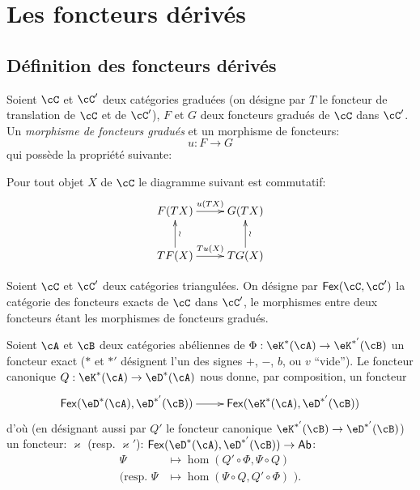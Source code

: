 \section{Les foncteurs dérivés}\label{VIII:4}










\subsection{Définition des foncteurs dérivés}\label{VIII:4-1}





\begin{definition}\label{VIII:4-1-1}
Soient $\cC$ et $\cC'$ deux catégories graduées (on désigne par $T$ le 
foncteur de translation de $\cC$ et de $\cC'$), $F$ et $G$ deux foncteurs 
gradués de $\cC$ dans $\cC'$. Un \emph{morphisme de foncteurs gradués} et 
un morphisme de foncteurs: 
\[
  u:F\to G 
\]
qui possède la propriété suivante: 

Pour tout objet $X$ de $\cC$ le diagramme suivant est commutatif: 
\[\xymatrix{
  F(T X) \ar[r]^-{u(T X)} 
    & G(T X) \\
  T F(X) \ar[r]^-{T u(X)} \ar[u]_-\wr 
    & T G(X) \ar[u]_-\wr 
}\]
\end{definition}

Soient $\cC$ et $\cC'$ deux catégories triangulées. On désigne par 
$\mathsf{Fex}(\cC,\cC')$ la catégorie des foncteurs exacts de $\cC$ dans 
$\cC'$, le morphismes entre deux foncteurs étant les morphismes de foncteurs 
gradués. 

Soient $\cA$ et $\cB$ deux catégories abéliennes de 
$\Phi:\eK^\ast(\cA)\to \eK^{\ast'}(\cB)$ un foncteur exact ($\ast$ et $\ast'$ 
désignent l'un des signes $+$, $-$, $b$, ou $v$ ``vide''). Le foncteur 
canonique $Q:\eK^\ast(\cA)\to \eD^\ast(\cA)$ nous donne, par composition, un 
foncteur 
\[\xymatrix{
  \mathsf{Fex}(\eD^\ast(\cA),\eD^{\ast'}(\cB)) \ar[r] 
    & \mathsf{Fex}(\eK^\ast(\cA),\eD^{\ast'}(\cB)) 
}\]
d'où (en désignant aussi par $Q'$ le foncteur canonique 
$\eK^{\ast'}(\cB) \to \eD^{\ast'}(\cB)$) un foncteur: 
$\varkappa$ (resp. $\varkappa'$): 
$\mathsf{Fex}(\eD^\ast(\cA),\eD^{\ast'}(\cB)) \to \mathsf{Ab}$: 
\begin{align*}
  \Psi  &\mapsto \hom(Q'\circ \Phi,\Psi\circ Q) \\
  (\text{resp. }\Psi &\mapsto \hom(\Psi\circ Q,Q'\circ \Phi)\text{ ).} 
\end{align*}





